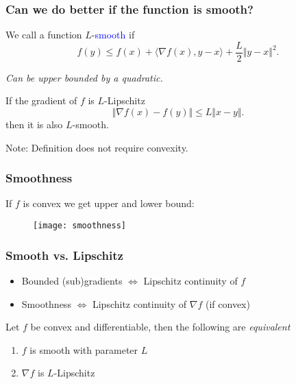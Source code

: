 \documentclass{beamer}
\begin{document}
\begin{frame}
  \frametitle{Can we do better if the function is smooth?}
  \begin{definition}
    We call a function $L$-\textcolor{blue}{smooth} if
    \begin{equation}
      f(y) \le f(x) + \langle \nabla f(x), y-x \rangle + \frac{L}{2} \Vert y-x \Vert^2.
    \end{equation}
  \end{definition}
  \begin{center}
    \textit{Can be upper bounded by a quadratic.}
  \end{center}
  \begin{lemma}%
    If the gradient of $f$ is $L$-Lipschitz
    \begin{equation}
      \Vert \nabla f(x)-f(y) \Vert \le L \Vert x-y \Vert.
    \end{equation}
    then it is also $L$-smooth.
  \end{lemma}
  Note: Definition does not require convexity.
\end{frame}


\begin{frame}
  \frametitle{Smoothness}
  If $f$ is convex we get upper and lower bound:

  \begin{figure}[ht]
    \centering
    \texttt{[image: smoothness]}
  \end{figure}
\end{frame}


\begin{frame}
  \frametitle{Smooth vs. Lipschitz}
  \begin{itemize}
    \item Bounded (sub)gradients $\Leftrightarrow$ Lipschitz continuity of $f$
    \item Smoothness $\Leftrightarrow$ Lipschitz continuity of $\nabla f$ (if convex)
  \end{itemize}

  \begin{lemma}%
    Let $f$ be convex and differentiable, then the following are \textit{equivalent}
    \begin{enumerate}
      \item $f$ is smooth with parameter $L$
      \item $\nabla f$ is $L$-Lipschitz
    \end{enumerate}
  \end{lemma}
\end{frame}
\end{document}
